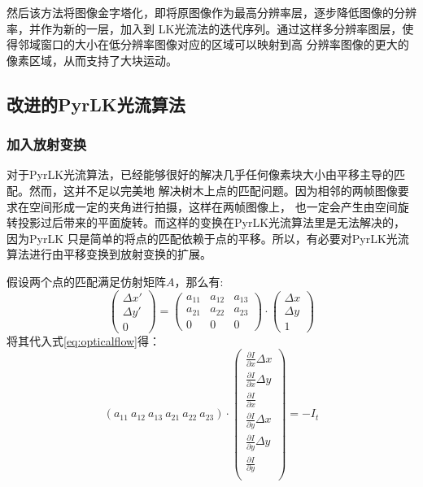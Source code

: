 然后该方法将图像金字塔化，即将原图像作为最高分辨率层，逐步降低图像的分辨率，并作为新的一层，加入到
LK光流法的迭代序列。通过这样多分辨率图层，使得邻域窗口的大小在低分辨率图像对应的区域可以映射到高
分辨率图像的更大的像素区域，从而支持了大块运动。

\subsection{改进的PyrLK光流算法}
\label{subsec:revisedpyrlk}
\subsubsection{加入放射变换}
对于PyrLK光流算法，已经能够很好的解决几乎任何像素块大小由平移主导的匹配。然而，这并不足以完美地
解决树木上点的匹配问题。因为相邻的两帧图像要求在空间形成一定的夹角进行拍摄，这样在两帧图像上，
也一定会产生由空间旋转投影过后带来的平面旋转。而这样的变换在PyrLK光流算法里是无法解决的，因为PyrLK
只是简单的将点的匹配依赖于点的平移。所以，有必要对PyrLK光流算法进行由平移变换到放射变换的扩展。

假设两个点的匹配满足仿射矩阵$A$，那么有:\\
\begin{equation}
	\left(
	\begin{array}{c}
		\Delta x'\\
		\Delta y'\\
		0
	\end{array}
	\right)
	=
	\left(
	\begin{array}{ccc}
		a_{11} & a_{12} & a_{13}\\
		a_{21} & a_{22} & a_{23}\\
				0 & 0 & 0
	\end{array}
	\right)
	\cdot
	\left(
	\begin{array}{c}
		\Delta x\\
		\Delta y\\
		1
	\end{array}
	\right)
\end{equation}
将其代入式\ref{eq:opticalflow}得：\\
\begin{equation}
	(a_{11}\ a_{12}\ a_{13}\ a_{21}\ a_{22}\ a_{23})\cdot
	\left(
	\begin{array}{c}
		\frac{\partial I}{\partial x}\Delta x\\
        \frac{\partial I}{\partial x}\Delta y\\
        \frac{\partial I}{\partial x}\\
        \frac{\partial I}{\partial y}\Delta x\\
        \frac{\partial I}{\partial y}\Delta y\\
        \frac{\partial I}{\partial y}\\
	\end{array}
	\right)
	=-I_t
\end{equation}

